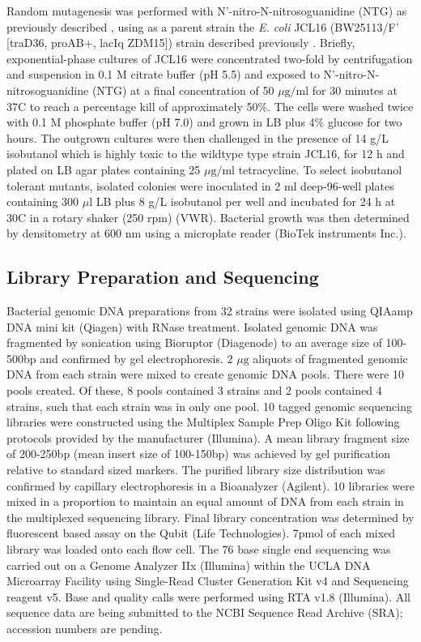 \documentclass[letterpaper,10pt,english]{howto}
\begin{document}
Random mutagenesis was performed with N'-nitro-N-nitrosoguanidine
(NTG) as previously described \cite{Miller72} , using as a parent
strain the \emph{E. coli} JCL16 (BW25113/F' {[}traD36, proAB+, lacIq ZDM15{]})
strain described previously \cite{Atsumi2008b} .  Briefly,
exponential-phase cultures of JCL16 were concentrated two-fold by
centrifugation and suspension in 0.1 M citrate buffer (pH 5.5) and
exposed to N'-nitro-N-nitrosoguanidine (NTG) at a final concentration of
50 $\mu\text{g/ml}$
for 30 minutes at 37C to reach a percentage kill of
approximately 50\%. The cells were washed twice with 0.1 M phosphate
buffer (pH 7.0) and grown in LB plus 4\% glucose for two hours. The
outgrown cultures were then challenged in the presence of 14 g/L
isobutanol which is highly toxic to the wildtype type strain JCL16, for 12
h and plated on LB agar plates containing
25 $\mu\text{g/ml}$ tetracycline. To
select isobutanol tolerant mutants, isolated colonies were inoculated
in 2 ml deep-96-well plates containing 300 $\mu\text{l}$ LB
plus 8 g/L isobutanol
per well and incubated for 24 h at 30C in a rotary shaker (250 rpm)
(VWR). Bacterial growth was then determined by densitometry at 600 nm
using a microplate reader (BioTek instruments Inc.).


\subsection{Library Preparation and Sequencing}

Bacterial genomic DNA preparations from 32 strains were isolated using
QIAamp DNA mini kit (Qiagen) with RNase treatment. Isolated genomic
DNA was fragmented by sonication using Bioruptor (Diagenode) to an
average size of 100-500bp and confirmed by gel electrophoresis.
2 $\mu\text{g}$
aliquots of fragmented genomic DNA from each strain were mixed to
create genomic DNA pools. There were 10 pools created. Of these, 8
pools contained 3 strains and 2 pools contained 4 strains, such that
each strain was in only one pool. 10 tagged genomic sequencing
libraries were constructed using the Multiplex Sample Prep Oligo Kit
following protocols provided by the manufacturer (Illumina).  A mean
library fragment size of 200-250bp (mean insert size of 100-150bp) was
achieved by gel purification relative to standard sized markers. The
purified library size distribution was confirmed by capillary
electrophoresis in a Bioanalyzer (Agilent).  10 libraries were mixed
in a proportion to maintain an equal amount of DNA from each strain in
the multiplexed sequencing library. Final library concentration was
determined by fluorescent based assay on the Qubit (Life
Technologies).  7pmol of each mixed library was loaded onto each flow
cell.  The 76 base single end sequencing was carried out on a Genome
Analyzer IIx (Illumina) within the UCLA DNA Microarray Facility using
Single-Read Cluster Generation Kit v4 and Sequencing reagent v5.
Base and quality calls were performed using RTA v1.8 (Illumina).
All sequence data are being submitted to the NCBI Sequence Read
Archive (SRA); accession numbers are pending.
\end{document}
